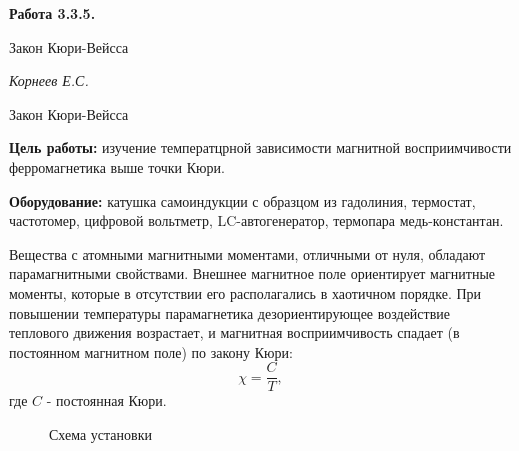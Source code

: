 \documentclass[14pt]{article}
\begin{document}
\begin{titlepage}
	\begin{center}
		\fontsize{18pt}{20pt}\selectfont
		\textbf{Работа 3.3.5.}	
	
		\vspace{5cm}
		\fontsize{24pt}{25pt}\selectfont
		Закон Кюри-Вейсса
	\end{center}
	\begin{flushright}
		\fontsize{18pt}{20pt}\selectfont
		\vspace{14cm}
		\hspace{-3cm}
		\textit{Корнеев Е.С.}
	\end{flushright}		
\end{titlepage}

\begin{center}
	\fontsize{16pt}{18pt}\selectfont	
	Закон Кюри-Вейсса
\end{center}


\fontsize{14pt}{16pt}\selectfont
\vspace{1cm}
\textbf{Цель работы:} изучение температцрной зависимости магнитной восприимчивости ферромагнетика выше точки Кюри.

\vspace{0.5cm}
\textbf{Оборудование:} катушка самоиндукции с образцом из гадолиния, термостат, частотомер, цифровой вольтметр, LC-автогенератор, термопара медь-константан. 

\vspace{1cm}
Вещества с атомными магнитными моментами, отличными от нуля, обладают парамагнитными свойствами. Внешнее магнитное поле ориентирует магнитные моменты, которые в отсутствии его располагались в хаотичном порядке. При повышении температуры парамагнетика дезориентирующее воздействие теплового движения возрастает, и магнитная восприимчивость спадает (в постоянном магнитном поле) по закону Кюри:
$$
	\chi = \frac{C}{T},
$$
\noindent где $C$ - постоянная Кюри.

\begin{figure}[h!]
	\caption{Схема установки}
	\label{fig:image}
\end{figure}
\end{document}
